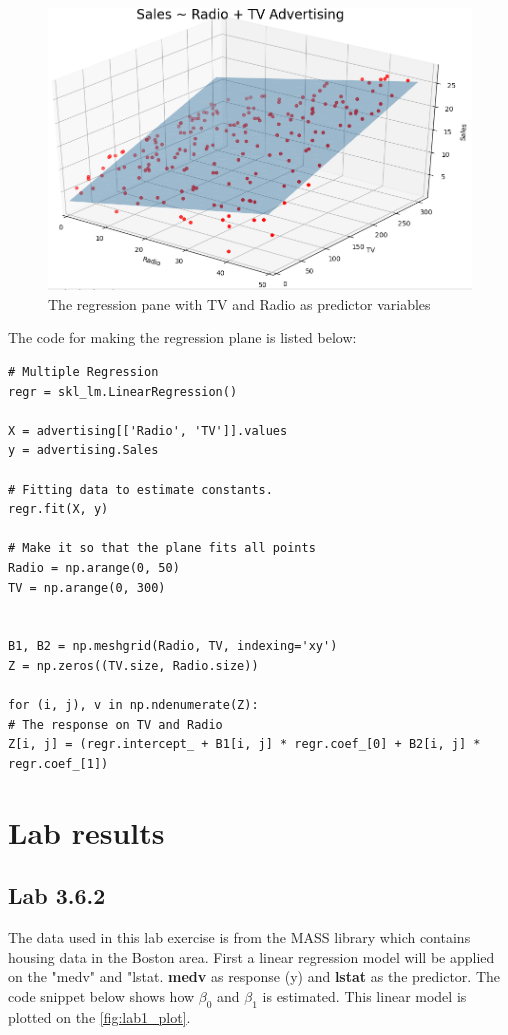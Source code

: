 \begin{figure}[H]
	\centering
	\includegraphics[width=\textwidth]{Img/Multi_reg_plane.PNG}
	\caption{The regression pane with TV and Radio as predictor variables}
	\label{fig:Multi_reg_plane}
\end{figure} 

The code for making the regression plane is listed below:

\begin{lstlisting}
# Multiple Regression
regr = skl_lm.LinearRegression()

X = advertising[['Radio', 'TV']].values
y = advertising.Sales

# Fitting data to estimate constants.
regr.fit(X, y)

# Make it so that the plane fits all points
Radio = np.arange(0, 50)
TV = np.arange(0, 300)


B1, B2 = np.meshgrid(Radio, TV, indexing='xy')
Z = np.zeros((TV.size, Radio.size))

for (i, j), v in np.ndenumerate(Z):
# The response on TV and Radio
Z[i, j] = (regr.intercept_ + B1[i, j] * regr.coef_[0] + B2[i, j] * regr.coef_[1])
\end{lstlisting}


\newpage

\section{Lab results}
\subsection{Lab 3.6.2}
The data used in this lab exercise is from the MASS library which contains housing data in the Boston area. First a linear regression model will be applied on the "medv" and "lstat. \textbf{medv} as response (y) and \textbf{lstat} as the predictor. The code snippet below shows how $\beta_0$ and $\beta_1$ is estimated. This linear model is plotted on the \cref{fig:lab1_plot}.

